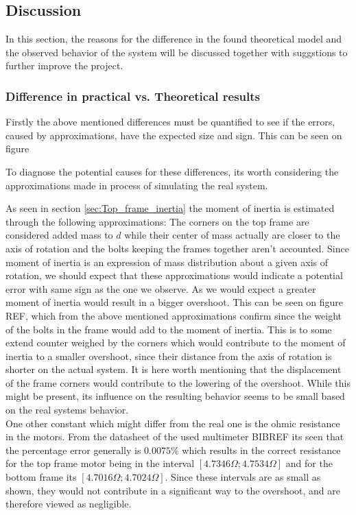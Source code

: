 \documentclass[../../main]{subfiles}
\begin{document}
\subsection{Discussion}
\label{sec:discussion}
In this section, the reasons for the difference in the found theoretical model and the observed behavior of the system will be discussed together with suggstions to further improve the project.

\subsubsection{Difference in practical vs. Theoretical results}
Firstly the above mentioned differences must be quantified to see if the errors, caused by approximations, have the expected size and sign. This can be seen on figure 


To diagnose the potential causes for these differences, its worth considering the approximations made in process of simulating the real system.


As seen in section \ref{sec:Top_frame_inertia} the moment of inertia is estimated through the following approximations: The corners on the top frame are considered added mass to $d$ while their center of mass actually are closer to the axis of rotation and the bolts keeping the frames together aren't accounted. Since moment of inertia is an expression of mass distribution about a given axis of rotation, we should expect that these approximations would indicate a potential error with same sign as the one we observe. As we would expect a greater moment of inertia would result in a bigger overshoot. This can be seen on figure REF, which from the above mentioned approximations confirm since the weight of the bolts in the frame would add to the moment of inertia. This is to some extend counter weighed by the corners which would contribute to the moment of inertia to a smaller overshoot, since their distance from the axis of rotation is shorter on the actual system. It is here worth mentioning that the displacement of the frame corners would contribute to the lowering of the overshoot. While this might be present, its influence on the resulting behavior seems to be small based on the real systems behavior.\\
One other constant which might differ from the real one is the ohmic resistance in the motors. From the datasheet of the used multimeter BIBREF its seen that the percentage error generally is $0.0075\%$ which results in the correct resistance for the top frame motor being in the interval $[4.7346\Omega;4.7534\Omega]$ and for the bottom frame its $[4.7016\Omega;4.7024\Omega]$. Since these intervals are as small as shown, they would not contribute in a significant way to the overshoot, and are therefore viewed as negligible.\\
\end{document}
